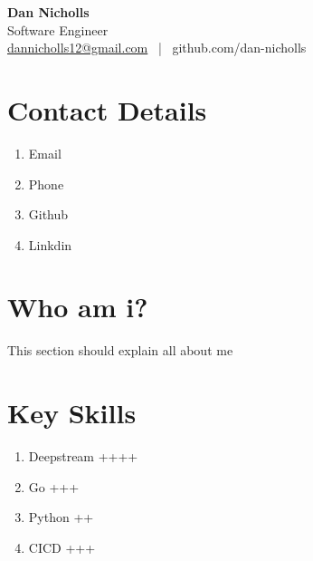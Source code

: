 \documentclass[10pt]{article}
\begin{document}
\begin{center}
	{\LARGE \textbf{Dan Nicholls}} \\
	\vspace{0.5em}
	Software Engineer \\
	\href{mailto:dannicholls12@gmail.com}{dannicholls12@gmail.com} ~|~ github.com/dan-nicholls
\end{center}

\section{Contact Details}
\begin{enumerate}
	\item Email
	\item Phone 
	\item Github
	\item Linkdin
\end{enumerate}

\section{Who am i?}
This section should explain all about me


\section{Key Skills}
\begin{enumerate}
	\item Deepstream ++++
	\item Go +++
	\item Python ++
	\item CICD +++
\end{enumerate}
\end{document}
